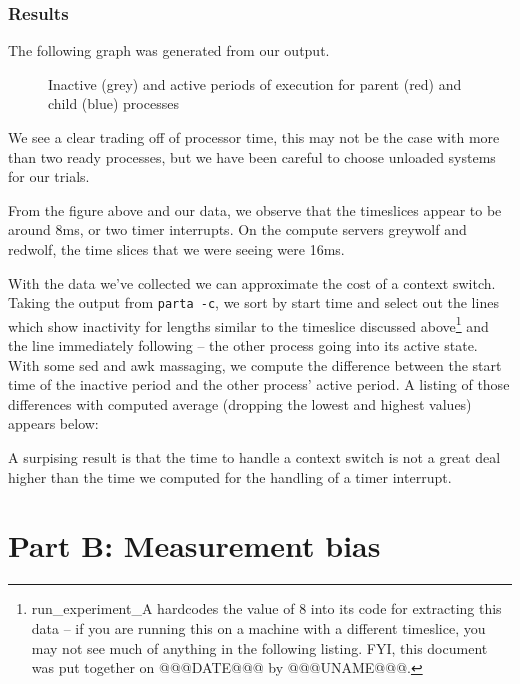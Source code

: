 \documentclass{article}
\begin{document}
\subsubsection{Results}
The following graph was generated from our output.
\begin{figure}[h]
    \caption{Inactive (grey) and active periods of execution for parent (red)
    and child (blue) processes}
    
\end{figure}

We see a clear trading off of processor time, this may not be the case with 
more than two ready processes, but we have been careful to choose unloaded
systems for our trials.

From the figure above and our data, we observe that the timeslices appear to
be around 8ms, or two timer interrupts. On the compute servers greywolf and 
redwolf, the time slices that we were seeing were 16ms.

With the data we've collected we can approximate the cost of a context switch.
Taking the output from \lstinline{parta -c}, we sort by start time and select
out the lines which show inactivity for lengths similar to the timeslice
discussed above\footnote{run\_experiment\_A hardcodes the value of 8 into its
code for extracting this data -- if you are running this on a machine with a
different timeslice, you may not see much of anything in the following listing.
FYI, this document was put together on @@@DATE@@@ by @@@UNAME@@@.}
and the line immediately following -- the other process going
into its active state. With some sed and awk massaging, we compute the
difference between the start time of the inactive period and the other
process' active period. A listing of those differences with computed average
(dropping the lowest and highest values) appears below:
\begin{framed}
    \label{lst:switch_time}
    
\end{framed}

A surpising result is that the time to handle a context switch is not a great
deal higher than the time we computed for the handling of a timer interrupt.

\newpage
\section{Part B: Measurement bias}
\label{sec:B}
\end{document}
